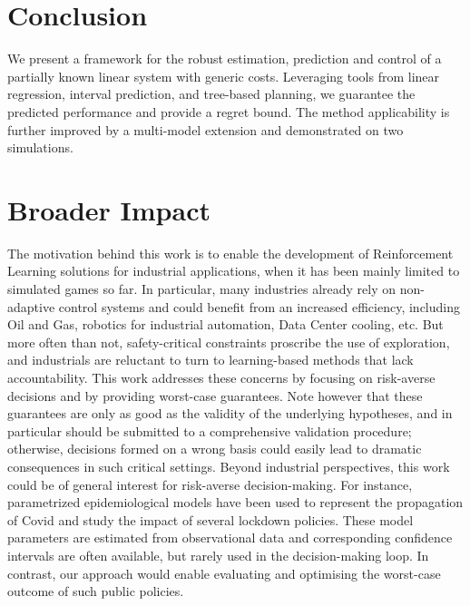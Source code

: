 \documentclass{article}
\begin{document}
\section*{Conclusion}

We present a framework for the robust estimation, prediction and control of a partially known linear system with generic costs. Leveraging tools from linear regression, interval prediction, and tree-based planning, we guarantee the predicted performance and provide a regret bound. The method applicability is further improved by a multi-model extension and demonstrated on two simulations.

\clearpage


\section*{Broader Impact}

The motivation behind this work is to enable the development of Reinforcement Learning solutions for industrial applications, when it has been mainly limited to simulated games so far. In particular, many industries already rely on non-adaptive control systems and could benefit from an increased efficiency, including Oil and Gas, robotics for industrial automation, Data Center cooling, etc. But more often than not, safety-critical constraints proscribe the use of exploration, and industrials are reluctant to turn to learning-based methods that lack accountability. This work addresses these concerns by focusing on risk-averse decisions and by providing worst-case guarantees. Note however that these guarantees are only as good as the validity of the underlying hypotheses, and  in particular should be submitted to a comprehensive validation procedure; otherwise, decisions formed on a wrong basis could easily lead to dramatic consequences in such critical settings.
Beyond industrial perspectives, this work could be of general interest for risk-averse decision-making. For instance, parametrized epidemiological models have been used to represent the propagation of Covid and study the impact of several lockdown policies. These model parameters are estimated from observational data and corresponding confidence intervals are often available, but rarely used in the decision-making loop. In contrast, our approach would enable evaluating and optimising the worst-case outcome of such public policies.




\end{document}
